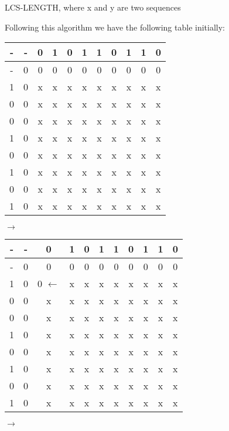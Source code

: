 \documentclass[11pt]{article}
\begin{document}
\begin{enumerate}
\begin{algorithm}[H]
{{{                    }
                }
            }
        \caption{LCS-LENGTH, where x and y are two sequences}
    \end{algorithm}
    Following this algorithm we have the following table initially:
    \\
    \begin{tabular}{ c | c c c c c c c c c c } 
        - & - & 0 & 1 & 0 & 1 & 1 & 0 & 1 & 1 & 0 \\
        \hline
        - & 0 & 0 & 0 & 0 & 0 & 0 & 0 & 0 & 0 & 0 \\
        1 & 0 & x & x & x & x & x & x & x & x & x \\
        0 & 0 & x & x & x & x & x & x & x & x & x \\
        0 & 0 & x & x & x & x & x & x & x & x & x \\
        1 & 0 & x & x & x & x & x & x & x & x & x \\
        0 & 0 & x & x & x & x & x & x & x & x & x \\
        1 & 0 & x & x & x & x & x & x & x & x & x \\
        0 & 0 & x & x & x & x & x & x & x & x & x \\
        1 & 0 & x & x & x & x & x & x & x & x & x \\
    \end{tabular}
    $\rightarrow$
    \begin{tabular}{ c | c c c c c c c c c c } 
        - & - & 0 & 1 & 0 & 1 & 1 & 0 & 1 & 1 & 0 \\
        \hline
        - & 0 & 0 & 0 & 0 & 0 & 0 & 0 & 0 & 0 & 0 \\
        1 & 0 & 0 $\leftarrow$ & x & x & x & x & x & x & x & x \\
        0 & 0 & x & x & x & x & x & x & x & x & x \\
        0 & 0 & x & x & x & x & x & x & x & x & x \\
        1 & 0 & x & x & x & x & x & x & x & x & x \\
        0 & 0 & x & x & x & x & x & x & x & x & x \\
        1 & 0 & x & x & x & x & x & x & x & x & x \\
        0 & 0 & x & x & x & x & x & x & x & x & x \\
        1 & 0 & x & x & x & x & x & x & x & x & x \\
    \end{tabular}
    $\rightarrow$ \\
    \begin{tabular}{ c | c c c c c c c c c c } 

\end{tabular}
\end{enumerate}
\end{document}
